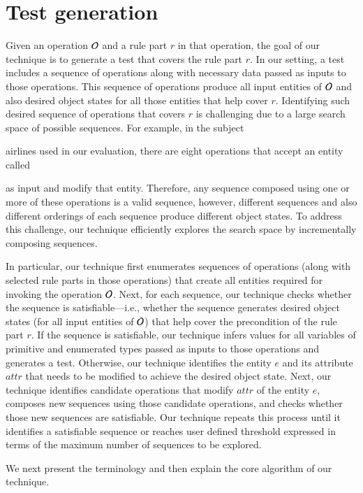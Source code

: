 \section{Test generation}

Given an operation ${\cal O}$ and a rule part $r$ in that operation, the goal 
of our technique is to generate a test that covers the rule part $r$. In our setting,
a test includes a sequence of operations along with necessary data passed
as inputs to those operations. This sequence of operations produce all input entities
of ${\cal O}$ and also desired object states for all those entities that help cover
$r$. Identifying such desired sequence of operations
that covers $r$ is challenging due to a large search space of possible sequences.
For example, in the subject \subject{Cebu-pacific} airlines used in our evaluation,
there are eight operations that accept an entity called \subject{Ticket}
as input and modify that entity. Therefore,
any sequence composed using one or more of these operations is a valid sequence, however, different 
sequences and also different orderings of each sequence
produce different object states. To address this challenge, our 
technique efficiently explores the search space by incrementally composing
sequences.

In particular, our technique first enumerates
sequences of operations (along with selected rule parts in those operations) 
that create all entities required for invoking
the operation ${\cal O}$. Next, for each sequence, our technique checks whether
the sequence is satisfiable---i.e., whether the sequence generates desired
object states (for all input entities of ${\cal O}$) that help cover the
precondition of the rule part $r$. If the sequence is satisfiable, our technique
infers values for all variables of primitive and enumerated types passed as inputs to those operations
and generates a test. Otherwise, our technique identifies the entity $e$ 
and its attribute $attr$ that needs to be modified
to achieve the desired object state. Next, our technique identifies candidate
operations that modify $attr$ of the entity $e$, composes
new sequences using those candidate operations, and checks whether those
new sequences are satisfiable. Our technique repeats this
process until it identifies a satisfiable sequence or reaches user defined threshold
expressed in terms of the maximum number of sequences to be explored.

We next present the terminology and then explain the core algorithm of our technique.

